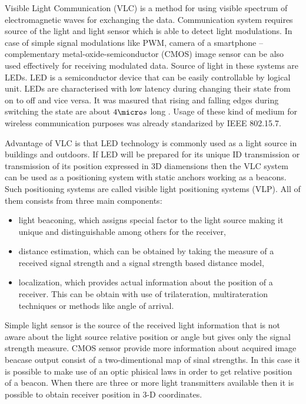 \documentclass[../main.tex]{subfiles}
\begin{document}
Visible Light Communication (VLC) is a method for using visible spectrum of electromagnetic waves for exchanging the data. Communication system requires source of the light and light sensor which is able to detect light modulations. In case of simple signal modulations like PWM, camera of a smartphone -- complementary
metal-oxide-semiconductor (CMOS) image sensor can be also used effectively for receiving modulated data. Source of light in these systems are LEDs. LED is a semiconductor device that can be easily controllable by logical unit. LEDs are characterised with low latency during changing their state from on to off and vice versa. It was masured that rising and falling edges during switching the state are about $4 \micro s$ long \cite{visible_light_positioning_epsilon}. Usage of these kind of medium for wireless communication purposes was already standarized by IEEE 802.15.7.

Advantage of VLC is that LED technology is commonly used as a light source in buildings and outdoors. If LED will be prepared for its unique ID transmission or transmission of its position expressed in 3D diamensions then the VLC system can be used as a positioning system with static anchors working as a beacons. Such positioning systems are called visible light positioning systems (VLP). All of them consists from three main components:
\begin{itemize}
	\item light beaconing, which assigns special factor to the light source making it unique and distinguishable among others for the receiver,
	\item distance estimation, which can be obtained by taking the measure of a received signal strength and a signal strength based distance model,
	\item localization, which provides actual information about the position of a receiver. This can be obtain with use of trilateration, multirateration techniques or methods like angle of arrival.
\end{itemize}

Simple light sensor is the source of the received light information that is not aware about the light source relative position or angle but gives only the signal strength measure. CMOS sensor provide more information about acquired image beacase output consist of a two-dimentional map of sinal strengths. In this case it is possible to make use of an optic phisical laws in order to get relative position of a beacon. When there are three or more light transmitters available then it is possible to obtain receiver position in 3-D coordinates.
\end{document}
